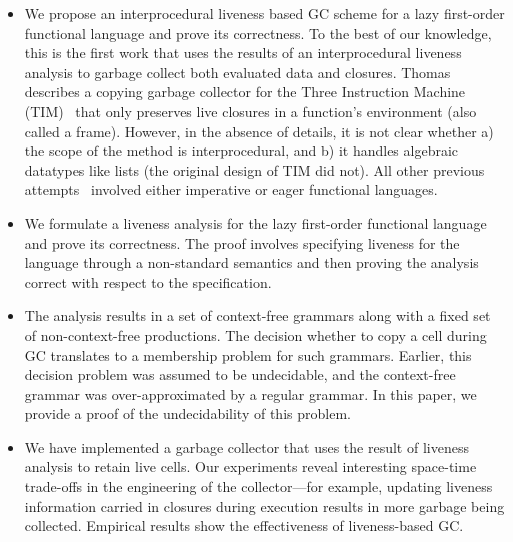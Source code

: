 \documentclass[9pt,nonatbib]{sigplanconf}
\begin{document}
\begin{itemize}
\item We  propose an interprocedural liveness  based GC
  scheme  for a  lazy first-order functional  language and  prove its
  correctness.  To the  best of our knowledge, this is  the first work
  that uses  the results  of an  interprocedural liveness  analysis to
  garbage    collect    both     evaluated    data    and    closures.
  Thomas~\cite{Thomas19951} describes a  copying garbage collector for
  the Three  Instruction Machine (TIM)~\cite{Fairbairn1987}  that only
  preserves live closures  in a function's environment  (also called a
  frame). However, in the absence of  details, it is not clear whether
  a) the  scope of the  method is  interprocedural, and b)  it handles
  algebraic datatypes like lists (the original design of TIM did not).
  All  other  previous attempts~\cite{shaham01heap,  ran.shaham-sas03,
    shaham02estimating,  asati14lgc, karkare06effectiveness}  involved
  either imperative or eager functional languages.

\item  We  formulate a  liveness  analysis  for the  lazy  first-order
  functional language  and prove  its correctness. The  proof involves
  specifying  liveness   for  the  language  through   a  non-standard
  semantics and then proving the  analysis correct with respect to the
  specification.

\item The  analysis results  in a set  of context-free  grammars along
  with  a fixed  set  of non-context-free  productions.  The  decision
  whether to copy a cell during  GC translates to a membership problem
  for such grammars.  Earlier, this decision problem was assumed to be
  undecidable, and the context-free grammar was over-approximated by a
  regular  grammar.   In  this  paper,  we  provide  a  proof  of  the
  undecidability of this problem.

\item We have implemented a garbage collector that uses the result of
  liveness  analysis to  retain  live cells.   Our experiments  reveal
  interesting  space-time   trade-offs  in  the  engineering   of  the
  collector---for  example, updating  liveness information  carried in
  closures during  execution results in more  garbage being collected.
  Empirical results  show the effectiveness of  liveness-based GC.
\end{itemize}
\end{document}

